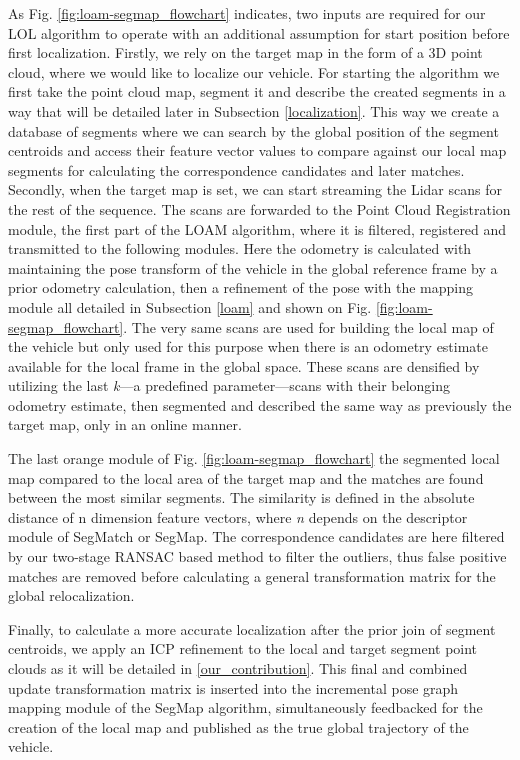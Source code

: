 \documentclass[letterpaper, 10 pt, conference]{ieeeconf}  %
\begin{document}
As Fig. \ref{fig:loam-segmap_flowchart} indicates, two inputs are required for our LOL algorithm to operate with an additional assumption for start position before first localization. Firstly, we rely on the target map in the form of a 3D point cloud, where we would like to localize our vehicle. For starting the algorithm we first take the point cloud map, segment it and describe the created segments in a way that will be detailed later in Subsection \ref{localization}. This way we create a database of segments where we can search by the global position of the segment centroids and access their feature vector values to compare against our local map segments for calculating the correspondence candidates and later matches. Secondly, when the target map is set, we can start streaming the Lidar scans for the rest of the sequence. The scans are forwarded to the Point Cloud Registration module, the first part of the LOAM algorithm, where it is filtered, registered and transmitted to the following modules. Here the odometry is calculated with maintaining the pose transform of the vehicle in the global reference frame by a prior odometry calculation, then a refinement of the pose with the mapping module all detailed in Subsection \ref{loam} and shown on Fig. \ref{fig:loam-segmap_flowchart}. The very same scans are used for building the local map of the vehicle but only used for this purpose when there is an odometry estimate available for the local frame in the global space. These scans are densified by utilizing the last \textit{k}---a predefined parameter---scans with their belonging odometry estimate, then segmented and described the same way as previously the target map, only in an online manner. 

The last orange module of Fig. \ref{fig:loam-segmap_flowchart} the segmented local map compared to the local area of the target map and the matches are found between the most similar segments. The similarity is defined in the absolute distance of n dimension feature vectors, where \textit{n} depends on the descriptor module of SegMatch \cite{segmatch} or SegMap. The correspondence candidates are here filtered by our two-stage RANSAC based method to filter the outliers, thus false positive matches are removed before calculating a general transformation matrix for the global relocalization. 

Finally, to calculate a more accurate localization after the prior join of segment centroids, we apply an ICP refinement to the local and target segment point clouds as it will be detailed in \ref{our_contribution}. This final and combined update transformation matrix is inserted into the incremental pose graph mapping module of the SegMap algorithm, simultaneously feedbacked for the creation of the local map and published as the true global trajectory of the vehicle.
\end{document}
